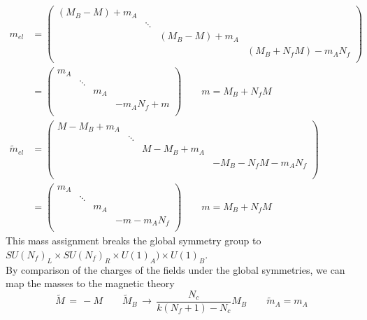 \begin{align}
m_{el} &= 
\begin{pmatrix}
   (M_B - M)  + m_A \\ &  \ddots 
   \\ 
   &  & (M_B - M)  + m_A \\
   &  &  & (M_B + N_f M) - m_A N_f  \\
  \end{pmatrix} \\
& = 
\begin{pmatrix}
   m_A \\ &  \ddots 
   \\ 
    & & m_A \\
    & &  & - m_A N_f + m  \\
  \end{pmatrix} \qquad m = M_B + N_f M\\
\tilde{m}_{el} &= 
\begin{pmatrix}
%
M -M_B   + m_A \\ & \ddots \\ & &  M -M_B   + m_A \\
& & &  - M_B -  N_f M - m_A N_f \\
\\
\end{pmatrix}
\\
&= 
 \begin{pmatrix}
  m_A \\ & \ddots \\ & &  m_A \\ & &  &  - m - m_A N_f \\     
 \end{pmatrix}
  \qquad m = M_B + N_f M
\end{align}
This mass assignment breaks the global symmetry group to $SU(N_f)_L \times SU(N_f)_R \times U(1)_A) \times U(1)_B$.\\
By comparison of the charges of the fields under the global symmetries, we can map the masses to the magnetic theory
\begin{equation}
 \tilde{M} \, = \, - M \qquad \tilde{M}_B \, \rightarrow \, \frac{N_c}{k (N_f+1) - N_c} M_B \qquad \tilde{m}_A = m_A
\end{equation}

